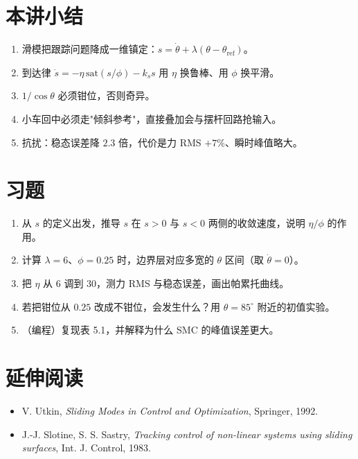 \section{本讲小结}
\begin{enumerate}[leftmargin=2em,itemsep=2pt]
  \item 滑模把跟踪问题降成一维镇定：$s=\dot\theta+\lambda(\theta-\theta_{\mathrm{ref}})$。
  \item 到达律 $\dot s=-\eta\,\mathrm{sat}(s/\phi)-k_s s$ 用 $\eta$ 换鲁棒、用 $\phi$ 换平滑。
  \item $1/\cos\theta$ 必须钳位，否则奇异。
  \item 小车回中必须走"倾斜参考"，直接叠加会与摆杆回路抢输入。
  \item 抗扰：稳态误差降 $2.3$ 倍，代价是力 RMS $+7\%$、瞬时峰值略大。
\end{enumerate}

\section*{习题}
\begin{enumerate}[leftmargin=2em,itemsep=6pt]
  \item 从 $s$ 的定义出发，推导 $s$ 在 $s>0$ 与 $s<0$ 两侧的收敛速度，说明 $\eta/\phi$ 的作用。
  \item 计算 $\lambda=6$、$\phi=0.25$ 时，边界层对应多宽的 $\theta$ 区间（取 $\dot\theta=0$）。
  \item 把 $\eta$ 从 $6$ 调到 $30$，测力 RMS 与稳态误差，画出帕累托曲线。
  \item 若把钳位从 $0.25$ 改成不钳位，会发生什么？用 $\theta=85^\circ$ 附近的初值实验。
  \item （编程）复现表 5.1，并解释为什么 SMC 的峰值误差更大。
\end{enumerate}

\section*{延伸阅读}
\begin{itemize}[leftmargin=2em,itemsep=2pt]
  \item V. Utkin, \emph{Sliding Modes in Control and Optimization}, Springer, 1992.
  \item J.-J. Slotine, S. S. Sastry, \emph{Tracking control of non-linear systems using sliding surfaces},
        Int. J. Control, 1983.
\end{itemize}
